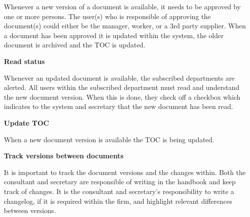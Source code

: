 Whenever a new version of a document is available, it needs to be approved by one or more persons.
The user(s) who is responsible of approving the document(s) could either be the manager, worker, or a 3rd party supplier.
When a document has been approved it is updated within the system, the older document is archived and the TOC is updated.

\textbf{Read status}

Whenever an updated document is available, the subscribed departments are alerted.
All users within the subscribed department must read and understand the new document version.
When this is done, they check off a checkbox which indicates to the system and secretary that the new document has been read.


\textbf{Update TOC}

When a new document version is available the TOC is being updated.

\textbf{Track versions between documents}

It is important to track the document versions and the changes within.
Both the consultant and secretary are responsible of writing in the handbook and keep track of changes.
It is the consultant and secretary’s responsibility to write a changelog, if it is required within the firm, and highlight relevant differences between versions.

